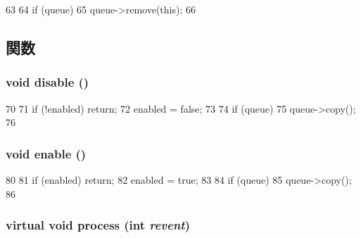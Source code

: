 \begin{DoxyCode}
63 {
64     if (queue)
65         queue->remove(this);
66 }
\end{DoxyCode}


\subsection{関数}
\hypertarget{classPollEvent_a8cfbbe53c1cf6e3054736daea3044c0f}{
\subsubsection[{disable}]{\setlength{\rightskip}{0pt plus 5cm}void disable ()}}
\label{classPollEvent_a8cfbbe53c1cf6e3054736daea3044c0f}



\begin{DoxyCode}
70 {
71     if (!enabled) return;
72     enabled = false;
73 
74     if (queue)
75         queue->copy();
76 }
\end{DoxyCode}
\hypertarget{classPollEvent_a486f22824bd83c5308a0d70ffac6f758}{
\subsubsection[{enable}]{\setlength{\rightskip}{0pt plus 5cm}void enable ()}}
\label{classPollEvent_a486f22824bd83c5308a0d70ffac6f758}



\begin{DoxyCode}
80 {
81     if (enabled) return;
82     enabled = true;
83 
84     if (queue)
85         queue->copy();
86 }
\end{DoxyCode}
\hypertarget{classPollEvent_a8b870dc0eeb339499d64aa56fc0e2aa5}{
\subsubsection[{process}]{\setlength{\rightskip}{0pt plus 5cm}virtual void process (int {\em revent})}}
\label{classPollEvent_a8b870dc0eeb339499d64aa56fc0e2aa5}



